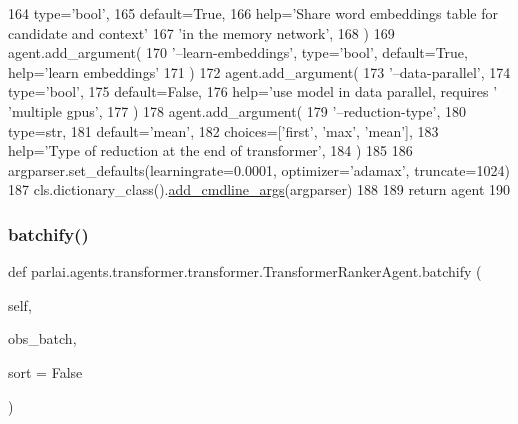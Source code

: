 \begin{DoxyCode}
164             type=\textcolor{stringliteral}{'bool'},
165             default=\textcolor{keyword}{True},
166             help=\textcolor{stringliteral}{'Share word embeddings table for candidate and context'}
167             \textcolor{stringliteral}{'in the memory network'},
168         )
169         agent.add\_argument(
170             \textcolor{stringliteral}{'--learn-embeddings'}, type=\textcolor{stringliteral}{'bool'}, default=\textcolor{keyword}{True}, help=\textcolor{stringliteral}{'learn embeddings'}
171         )
172         agent.add\_argument(
173             \textcolor{stringliteral}{'--data-parallel'},
174             type=\textcolor{stringliteral}{'bool'},
175             default=\textcolor{keyword}{False},
176             help=\textcolor{stringliteral}{'use model in data parallel, requires '} \textcolor{stringliteral}{'multiple gpus'},
177         )
178         agent.add\_argument(
179             \textcolor{stringliteral}{'--reduction-type'},
180             type=str,
181             default=\textcolor{stringliteral}{'mean'},
182             choices=[\textcolor{stringliteral}{'first'}, \textcolor{stringliteral}{'max'}, \textcolor{stringliteral}{'mean'}],
183             help=\textcolor{stringliteral}{'Type of reduction at the end of transformer'},
184         )
185 
186         argparser.set\_defaults(learningrate=0.0001, optimizer=\textcolor{stringliteral}{'adamax'}, truncate=1024)
187         cls.dictionary\_class().\hyperlink{namespaceparlai_1_1agents_1_1drqa_1_1config_a62fdd5554f1da6be0cba185271058320}{add\_cmdline\_args}(argparser)
188 
189         \textcolor{keywordflow}{return} agent
190 
\end{DoxyCode}
\mbox{\label{classparlai_1_1agents_1_1transformer_1_1transformer_1_1TransformerRankerAgent_a2592aa2dc8469ab671656597b4ba48a8}} 
\subsubsection{\texorpdfstring{batchify()}{batchify()}}
{\footnotesize\ttfamily def parlai.\+agents.\+transformer.\+transformer.\+Transformer\+Ranker\+Agent.\+batchify (\begin{DoxyParamCaption}\item[{}]{self,  }\item[{}]{obs\+\_\+batch,  }\item[{}]{sort = {\ttfamily False} }\end{DoxyParamCaption})}

